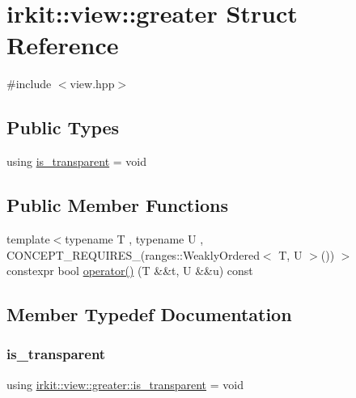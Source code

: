 \hypertarget{structirkit_1_1view_1_1greater}{}\section{irkit\+:\+:view\+:\+:greater Struct Reference}
\label{structirkit_1_1view_1_1greater}


{\ttfamily \#include $<$view.\+hpp$>$}

\subsection*{Public Types}
\begin{DoxyCompactItemize}
\item 
using \mbox{\hyperlink{structirkit_1_1view_1_1greater_a794a252233bff89d1d8c9754ae4bf974}{is\+\_\+transparent}} = void
\end{DoxyCompactItemize}
\subsection*{Public Member Functions}
\begin{DoxyCompactItemize}
\item 
{\footnotesize template$<$typename T , typename U , C\+O\+N\+C\+E\+P\+T\+\_\+\+R\+E\+Q\+U\+I\+R\+E\+S\+\_\+(ranges\+::\+Weakly\+Ordered$<$ T, U $>$()) $>$ }\\constexpr bool \mbox{\hyperlink{structirkit_1_1view_1_1greater_af6f67e2c5f9976b8e6a4ff3ddc9fbd1d}{operator()}} (T \&\&t, U \&\&u) const
\end{DoxyCompactItemize}


\subsection{Member Typedef Documentation}
\mbox{\label{structirkit_1_1view_1_1greater_a794a252233bff89d1d8c9754ae4bf974}} 
\subsubsection{\texorpdfstring{is\+\_\+transparent}{is\_transparent}}
{\footnotesize\ttfamily using \mbox{\hyperlink{structirkit_1_1view_1_1greater_a794a252233bff89d1d8c9754ae4bf974}{irkit\+::view\+::greater\+::is\+\_\+transparent}} =  void}



